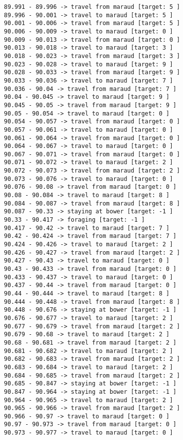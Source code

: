 \documentclass[11pt]{article}
\begin{document}
\begin{Verbatim}[commandchars=\\\{\}]
89.991 - 89.996 -> travel from maraud [target: 5 ]
89.996 - 90.001 -> travel to maraud [target: 5 ]
90.001 - 90.006 -> travel from maraud [target: 5 ]
90.006 - 90.009 -> travel to maraud [target: 0 ]
90.009 - 90.013 -> travel from maraud [target: 0 ]
90.013 - 90.018 -> travel to maraud [target: 3 ]
90.018 - 90.023 -> travel from maraud [target: 3 ]
90.023 - 90.028 -> travel to maraud [target: 9 ]
90.028 - 90.033 -> travel from maraud [target: 9 ]
90.033 - 90.036 -> travel to maraud [target: 7 ]
90.036 - 90.04 -> travel from maraud [target: 7 ]
90.04 - 90.045 -> travel to maraud [target: 9 ]
90.045 - 90.05 -> travel from maraud [target: 9 ]
90.05 - 90.054 -> travel to maraud [target: 0 ]
90.054 - 90.057 -> travel from maraud [target: 0 ]
90.057 - 90.061 -> travel to maraud [target: 0 ]
90.061 - 90.064 -> travel from maraud [target: 0 ]
90.064 - 90.067 -> travel to maraud [target: 0 ]
90.067 - 90.071 -> travel from maraud [target: 0 ]
90.071 - 90.072 -> travel to maraud [target: 2 ]
90.072 - 90.073 -> travel from maraud [target: 2 ]
90.073 - 90.076 -> travel to maraud [target: 0 ]
90.076 - 90.08 -> travel from maraud [target: 0 ]
90.08 - 90.084 -> travel to maraud [target: 8 ]
90.084 - 90.087 -> travel from maraud [target: 8 ]
90.087 - 90.33 -> staying at bower [target: -1 ]
90.33 - 90.417 -> foraging [target: -1 ]
90.417 - 90.42 -> travel to maraud [target: 7 ]
90.42 - 90.424 -> travel from maraud [target: 7 ]
90.424 - 90.426 -> travel to maraud [target: 2 ]
90.426 - 90.427 -> travel from maraud [target: 2 ]
90.427 - 90.43 -> travel to maraud [target: 0 ]
90.43 - 90.433 -> travel from maraud [target: 0 ]
90.433 - 90.437 -> travel to maraud [target: 0 ]
90.437 - 90.44 -> travel from maraud [target: 0 ]
90.44 - 90.444 -> travel to maraud [target: 8 ]
90.444 - 90.448 -> travel from maraud [target: 8 ]
90.448 - 90.676 -> staying at bower [target: -1 ]
90.676 - 90.677 -> travel to maraud [target: 2 ]
90.677 - 90.679 -> travel from maraud [target: 2 ]
90.679 - 90.68 -> travel to maraud [target: 2 ]
90.68 - 90.681 -> travel from maraud [target: 2 ]
90.681 - 90.682 -> travel to maraud [target: 2 ]
90.682 - 90.683 -> travel from maraud [target: 2 ]
90.683 - 90.684 -> travel to maraud [target: 2 ]
90.684 - 90.685 -> travel from maraud [target: 2 ]
90.685 - 90.847 -> staying at bower [target: -1 ]
90.847 - 90.964 -> staying at bower [target: -1 ]
90.964 - 90.965 -> travel to maraud [target: 2 ]
90.965 - 90.966 -> travel from maraud [target: 2 ]
90.966 - 90.97 -> travel to maraud [target: 0 ]
90.97 - 90.973 -> travel from maraud [target: 0 ]
90.973 - 90.977 -> travel to maraud [target: 0 ]

\end{Verbatim}
\end{document}
